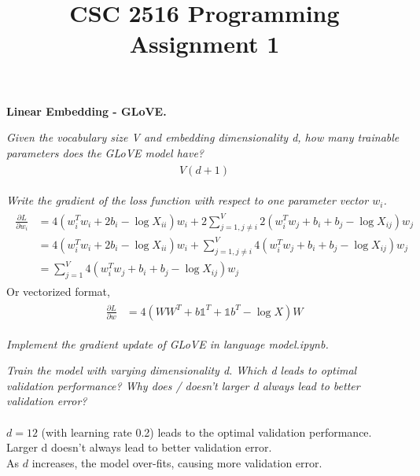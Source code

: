\documentclass{myhw}
\title{CSC 2516 Programming Assignment 1}
\begin{document}
\begin{homeworkProblem}
\textbf{Linear Embedding - GLoVE.}
\begin{homeworkSection}
\emph{Given the vocabulary size V and embedding dimensionality d, how many trainable parameters does the GLoVE model have?} 
\begin{gather*}
\begin{aligned}
V (d + 1)
\end{aligned}
\end{gather*}
\end{homeworkSection}
\begin{homeworkSection}
\emph{Write the gradient of the loss function with respect to one parameter vector $w_i$.}
\begin{gather*}
\begin{aligned}
\frac{\partial L}{\partial w_i} &= 
4 (w_i^T w_i + 2 b_i - \log X_{ii}) w_i + 
2 \sum_{j = 1, j \neq i}^V 2 (w_i^T w_j + b_i + b_j - \log X_{ij}) w_j \\
&= 4 (w_i^T w_i + 2 b_i - \log X_{ii}) w_i + 
\sum_{j = 1, j \neq i}^V 4 (w_i^T w_j + b_i + b_j - \log X_{ij}) w_j \\
&= \sum_{j = 1}^V 4 (w_i^T w_j + b_i + b_j - \log X_{ij}) w_j 
\end{aligned}
\end{gather*}
Or vectorized format,
\begin{gather*}
\begin{aligned}
\frac{\partial L}{\partial w} &= 
4 (WW^T + b\mathbb{1}^T + \mathbb{1} b^T - \log X) W
\end{aligned}
\end{gather*}
\end{homeworkSection}
\begin{homeworkSection}
\emph{Implement the gradient update of GLoVE in language model.ipynb.}
\end{homeworkSection}
\begin{homeworkSection}
\emph{Train the model with varying dimensionality d. Which d leads to optimal validation performance? Why does / doesn’t larger d always lead to better validation error?} \\
\\
$d=12$ (with learning rate 0.2) leads to the optimal validation performance. \\
Larger d doesn’t always lead to better validation error. \\
As $d$ increases, the model over-fits, causing more validation error.
\end{homeworkSection}
\end{homeworkProblem}
\end{document}

